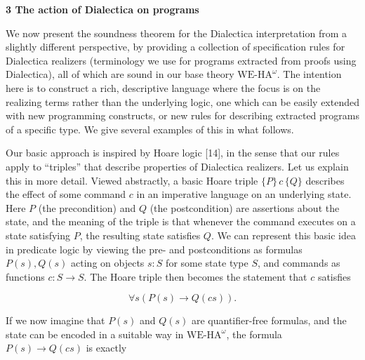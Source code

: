 \documentclass[10pt,a4paper]{article}
\begin{document}
 
 


 
\par\medskip\noindent\textbf{3 The action of Dialectica on programs}\par
 
 
We now present the soundness theorem for the Dialectica interpretation from a slightly different perspective, by providing a collection of specification rules for Dialectica realizers (terminology we use for programs extracted from proofs using Dialectica), all of which are sound in our base theory $\mathrm{WE}\mbox{-}\mathrm{HA}^{\omega}$. The intention here is to construct a rich, descriptive language where the focus is on the realizing terms rather than the underlying logic, one which can be easily extended with new programming constructs, or new rules for describing extracted programs of a specific type. We give several examples of this in what follows.\par
 
 
 
Our basic approach is inspired by Hoare logic [14], in the sense that our rules apply to “triples” that describe properties of Dialectica realizers. Let us explain this in more detail. Viewed abstractly, a basic Hoare triple $\{P\}\,{c}\,\{Q\}$ describes the effect of some command $c$ in an imperative language on an underlying state. Here $P$ (the precondition) and $Q$ (the postcondition) are assertions about the state, and the meaning of the triple is that whenever the command executes on a state satisfying $P$, the resulting state satisfies $Q$. We can represent this basic idea in predicate logic by viewing the pre- and postconditions as formulas $P(s),Q(s)$ acting on objects $s:S$ for some state type $S$, and commands as functions $c:S\to S$. The Hoare triple then becomes the statement that $c$ satisfies\par
  
\par  \quad  \[\forall s(P(s)\to Q(cs)).\]\quad  \quad  
  
If we now imagine that $P(s)$ and $Q(s)$ are quantifier-free formulas, and the state can be encoded in a suitable way in $\mathrm{WE}\mbox{-}\mathrm{HA}^{\omega}$, the formula $P(s)\to Q(cs)$ is exactly\par
  
\end{document}
